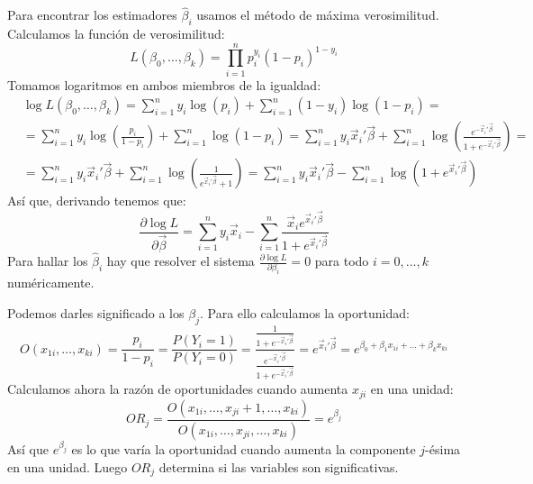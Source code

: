 Para encontrar los estimadores $\hat{\beta}_i$ usamos el método de máxima verosimilitud.
Calculamos la función de verosimilitud:
$$L(\beta_0, \dots, \beta_k) = \prod_{i=1}^n p_i^{y_i}(1-p_i)^{1-y_i}$$
Tomamos logaritmos en ambos miembros de la igualdad:
\begin{align*}
     & \log L(\beta_0, \dots, \beta_k) = \sum_{i=1}^n y_i\log(p_i) + \sum_{i=1}^n (1-y_i)\log(1-p_i) =                                                                                                                              \\
     & = \sum_{i=1}^n y_i\log\left(\frac{p_i}{1-p_i}\right) + \sum_{i=1}^n \log(1-p_i) = \sum_{i=1}^n y_i \vec{x}_i'\vec{\beta} + \sum_{i=1}^n \log\left(\frac{e^{-\vec{x}_i'\vec{\beta}}}{1 + e^{-\vec{x}_i'\vec{\beta}}}\right) = \\
     & = \sum_{i=1}^n y_i \vec{x}_i'\vec{\beta} + \sum_{i=1}^n \log\left(\frac{1}{e^{\vec{x}_i'\vec{\beta}} + 1}\right) = \sum_{i=1}^n y_i \vec{x}_i'\vec{\beta} - \sum_{i=1}^n \log(1 + e^{\vec{x}_i'\vec{\beta}})
\end{align*}
Así que, derivando tenemos que:
$$\frac{\partial \log L}{\partial \vec{\beta}} = \sum_{i=1}^n y_i\vec{x}_i - \sum_{i=1}^n \frac{\vec{x}_i e^{\vec{x}_i'\vec{\beta}}}{1 + e^{\vec{x}_i'\vec{\beta}}}$$
Para hallar los $\hat{\beta}_i$ hay que resolver el sistema $\frac{\partial \log L}{\partial \beta_i} = 0$ para todo $i = 0, \dots, k$ numéricamente.

Podemos darles significado a los $\beta_j$.
Para ello calculamos la oportunidad:
$$O(x_{1i}, \dots, x_{ki}) = \frac{p_i}{1-p_i} = \frac{P(Y_i = 1)}{P(Y_i = 0)} = \dfrac{\frac{1}{1+e^{-\vec{x}_i'\vec{\beta}}}}{\frac{e^{-\vec{x}_i'\vec{\beta}}}{1+e^{-\vec{x}_i'\vec{\beta}}}} = e^{\vec{x}_i'\vec{\beta}} = e^{\beta_0 + \beta_1x_{1i} + \dots + \beta_kx_{ki}}$$
Calculamos ahora la razón de oportunidades cuando aumenta $x_{ji}$ en una unidad:
$$OR_j = \frac{O(x_{1i}, \dots, x_{ji}+1, \dots, x_{ki})}{O(x_{1i}, \dots, x_{ji}, \dots, x_{ki})} = e^{\beta_j}$$
Así que $e^{\beta_j}$ es lo que varía la oportunidad cuando aumenta la componente $j$-ésima en una unidad.
Luego $OR_j$ determina si las variables son significativas.